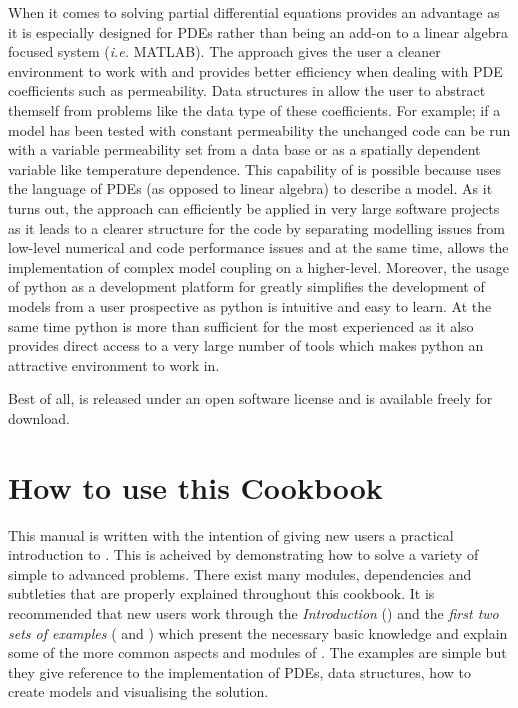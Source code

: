 When it comes to solving partial differential equations \esc provides an advantage as it is especially designed for PDEs rather than being an add-on to a linear algebra focused system (\textit{i.e.} MATLAB). The \esc approach gives the user a cleaner environment to work with and provides better efficiency when dealing with PDE coefficients such as permeability. Data structures in \esc allow the user to abstract themself from problems like the data type of these coefficients. For example; if a model has been tested with constant permeability the unchanged code can be run with a variable permeability set from a data base or as a spatially dependent variable like temperature dependence. This capability of \esc is possible because \esc uses the language of PDEs (as opposed to linear algebra) to describe a model. As it turns out, the \esc approach can efficiently be applied in very large software projects as it leads to a clearer structure for the code by separating modelling issues from low-level numerical and code performance issues and at the same time, allows the implementation of complex model coupling on a higher-level. Moreover, the usage of python as a development platform for \esc greatly simplifies the development of models from a user prospective as python is intuitive and easy to learn. At the same time python is more than sufficient for the most experienced as it also provides direct access to a very large number of tools which makes python an attractive environment to work in.

Best of all, \esc is released under an open software license and is available freely for download.

\section{How to use this Cookbook}
This manual is written with the intention of giving new users a practical introduction to \esc. This is acheived by demonstrating how to solve a variety of simple to advanced problems. There exist many modules, dependencies and subtleties that are properly explained throughout this cookbook. It is recommended that new users work through the \textit{Introduction} () and the \textit{first two sets of examples} ( and ) which present the necessary basic knowledge and explain some of the more common aspects and modules of \esc. The examples are simple but they give reference to the implementation of PDEs, data structures, how to create models and visualising the solution.

